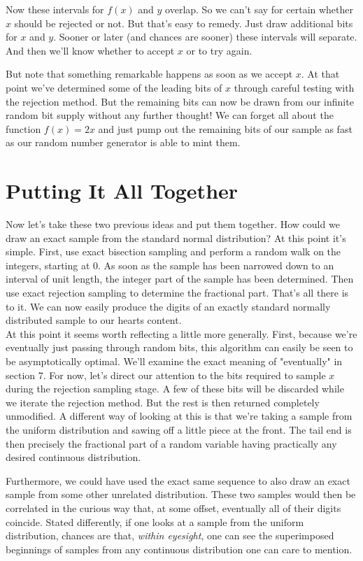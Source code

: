 \documentclass{article}
\begin{document}
Now these intervals for $f(x)$ and $y$ overlap. So we can't say for certain whether $x$ should be rejected or not. But that's easy to remedy. Just draw additional bits for $x$ and $y$. Sooner or later (and chances are sooner) these intervals will separate. And then we'll know whether to accept $x$ or to try again.

But note that something remarkable happens as soon as we accept $x$. At that point we've determined some of the leading bits of $x$ through careful testing with the rejection method. But the remaining bits can now be drawn from our infinite random bit supply without any further thought! We can forget all about the function $f(x)=2x$ and just pump out the remaining bits of our sample as fast as our random number generator is able to mint them.

\section{Putting It All Together}

Now let's take these two previous ideas and put them together. How could we draw an exact sample from the standard normal distribution? At this point it's simple. First, use exact bisection sampling and perform a random walk on the integers, starting at 0. As soon as the sample has been narrowed down to an interval of unit length, the integer part of the sample has been determined. Then use exact rejection sampling to determine the fractional part. That's all there is to it. We can now easily produce the digits of an exactly standard normally distributed sample to our hearts content.\\

At this point it seems worth reflecting a little more generally. First, because we're eventually just passing through random bits, this algorithm can easily be seen to be asymptotically optimal. We'll examine the exact meaning of "eventually" in section 7. For now, let's direct our attention to the bits required to sample $x$ during the rejection sampling stage. A few of these bits will be discarded while we iterate the rejection method. But the rest is then returned completely unmodified. A different way of looking at this is that we're taking a sample from the uniform distribution and sawing off a little piece at the front. The tail end is then precisely the fractional part of a random variable having practically any desired continuous distribution.

Furthermore, we could have used the exact same sequence to also draw an exact sample from some other unrelated distribution. These two samples would then be correlated in the curious way that, at some offset, eventually all of their digits coincide. Stated differently, if one looks at a sample from the uniform distribution, chances are that, \textit{within eyesight}, one can see the superimposed beginnings of samples from any continuous distribution one can care to mention.
\end{document}
